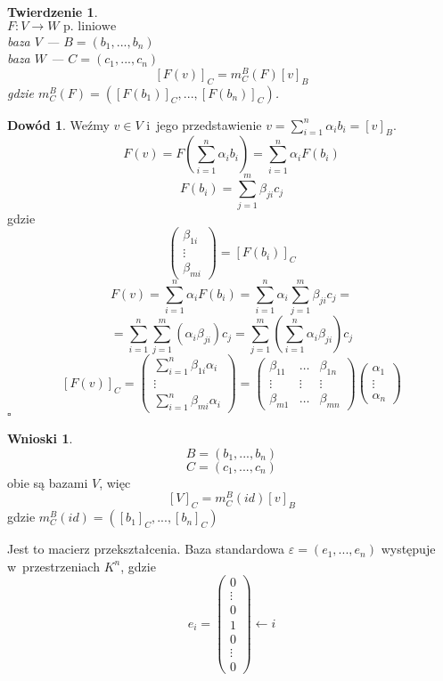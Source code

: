 \documentclass[12pt,a4paper]{article}
\renewcommand{\qed}{$\square$}
\theoremstyle{plain}
\newtheorem{tw}{Twierdzenie}[section]
\theoremstyle{definition}
\theoremstyle{definition}
\theoremstyle{definition}
\theoremstyle{definition}
\newtheorem*{dd}{Dowód}
\theoremstyle{definition}
\theoremstyle{definition}
\theoremstyle{definition}
\theoremstyle{definition}
\theoremstyle{definition}
\newtheorem*{wn}{Wnioski}
\begin{document}
\begin{tw} 
    ~\\
    $ F: V \rightarrow W \text{ p. liniowe}$ \\
    baza $V$ --- $B=(b_1, ..., b_n)$ \\
    baza $W$ --- $C=(c_1, ..., c_n)$ 
    $$ [F(v) ]_C = m^B_C(F)[v]_B $$ 
    gdzie $m^B_C(F)=([F(b_1)]_C, ..., [F(b_n)]_C)$.
\end{tw}

\begin{dd}
    Weźmy $v \in V$ i~jego przedstawienie $v=\sum\limits_{i=1}^n\alpha_ib_i = [v]_B$.
    \[F(v)=F\left(\sum_{i=1}^n\alpha_ib_i\right)=\sum_{i=1}^n\alpha_iF(b_i)\]
    \[F(b_i)=\sum_{j=1}^m\beta_{ji}c_j\]
    gdzie
    \[\begin{pmatrix}\beta_{1i} \\ \vdots \\ \beta_{mi}\end{pmatrix}=[F(b_i)]_C\]
    \[F(v)=\sum_{i=1}^n\alpha_iF(b_i)=\sum_{i=1}^n\alpha_i\sum_{j=1}^m\beta_{ji}c_j=\]
    \[=\sum_{i=1}^n\sum_{j=1}^m(\alpha_i\beta_{ji})c_j=\sum_{j=1}^m\left(\sum_{i=1}^n\alpha_i\beta_{ji}\right)c_j\]
    \[[F(v)]_C=\begin{pmatrix}\sum\limits_{i=1}^n\beta_{1i}\alpha_i\\ \vdots \\\sum\limits_{i=1}^n\beta_{mi}\alpha_i\end{pmatrix}=
     \begin{pmatrix}\beta_{11}& \dots &\beta_{1n}\\ \vdots & \vdots & \vdots\\\beta_{m1}& \dots&\beta_{mn}\end{pmatrix}
    \begin{pmatrix}\alpha_1\\ \vdots \\\alpha_n\end{pmatrix}  \] \hfill \qed
\end{dd}

\begin{wn}
    \[ B = (b_1, ..., b_n) \]
    \[ C = (c_1, ..., c_n) \]
    obie są bazami $V$, więc
    \[ [V]_C = m^B_C(id)[v]_B \]
    gdzie $m^B_C(id)=([b_1]_C, ..., [b_n]_C)$
    
    Jest to macierz przekształcenia.
    Baza standardowa $\varepsilon=(e_1, ..., e_n)$ występuje
    w~przestrzeniach $K^n$, gdzie
    \[e_i=\begin{pmatrix}0 \\ \vdots \\ 0 \\ 1 \\ 0 \\ \vdots \\ 0\end{pmatrix} \leftarrow i\]
\end{wn}
\end{document}

